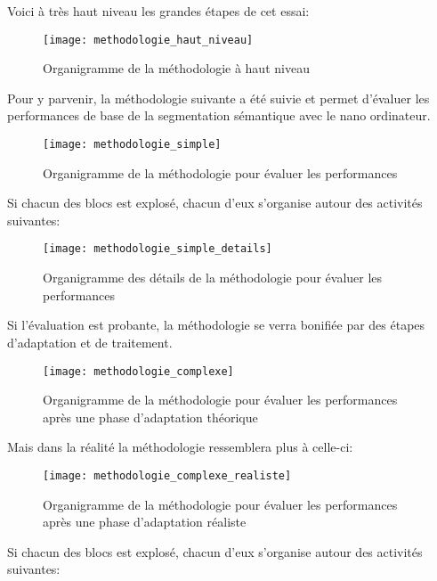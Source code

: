 ﻿\par Voici à très haut niveau les grandes étapes de cet essai:
\label{methodologie_haut_niveau}
\begin{figure}[H]
    \centering
    \texttt{[image: methodologie\_haut\_niveau]}
    \caption{Organigramme de la méthodologie à haut niveau}
    \label{fig:methodologie_haut_niveau}
\end{figure}
\par Pour y parvenir, la méthodologie suivante a été suivie et permet d'évaluer les performances de base de la segmentation sémantique avec le nano ordinateur.
\label{methodologie_simple}
\begin{figure}[H]
    \centering
    \texttt{[image: methodologie\_simple]}
    \caption{Organigramme de la méthodologie pour évaluer les performances}
    \label{fig:methodologie_simple}
\end{figure}
\par Si chacun des blocs est explosé, chacun d'eux s'organise autour des activités suivantes: 
\label{methodologie_simple_details}
\begin{figure}[H]
    \centering
    \texttt{[image: methodologie\_simple\_details]}
    \caption{Organigramme des détails de la méthodologie pour évaluer les performances}
    \label{fig:methodologie_simple_details}
\end{figure}
\par Si l'évaluation est probante, la méthodologie se verra bonifiée par des étapes d'adaptation et de traitement. 
\label{methodologie_complexe}
\begin{figure}[H]
    \centering
    \texttt{[image: methodologie\_complexe]}
    \caption{Organigramme de la méthodologie pour évaluer les performances après une phase d'adaptation théorique}
    \label{fig:methodologie_complexe}
\end{figure}
\par Mais dans la réalité la méthodologie ressemblera plus à celle-ci:
\label{methodologie_complexe_realiste}
\begin{figure}[H]
    \centering
    \texttt{[image: methodologie\_complexe\_realiste]}
    \caption{Organigramme de la méthodologie pour évaluer les performances après une phase d'adaptation réaliste}
    \label{fig:methodologie_complexe_realiste}
\end{figure}
\par Si chacun des blocs est explosé, chacun d'eux s'organise autour des activités suivantes: 
